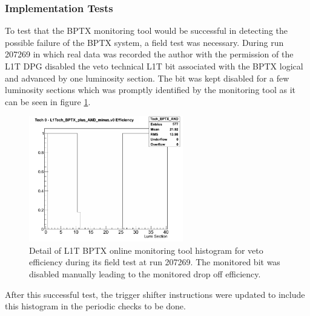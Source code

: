 \subsubsection{Implementation Tests}


To test that the \gls{BPTX} monitoring tool would be successful in detecting the possible failure of the \gls{BPTX} system, a field test was necessary. During run 207269 in which real data was recorded the author with the permission of the \gls{L1T} \gls{DPG} disabled the veto technical \gls{L1T} bit associated with the \gls{BPTX} logical and advanced by one luminosity section. The bit was kept disabled for a few luminosity sections which was promptly identified by the monitoring tool as it can be seen in figure \ref{FIGURE:TechnicalWork_L1TBPTX_ImplementationTests}.

\begin{figure}[!htb]
\centering
\includegraphics[width=0.60\textwidth]{Chapter03/L1TOnline/Images/L1TBPTX_Tech_BPTX_AND.png}
\caption[Detail of L1T BPTX online monitoring tool histogram for veto efficiency during its field test at run 207269.]
{Detail of \gls{L1T} \gls{BPTX} online monitoring tool histogram for veto efficiency during its field test at run 207269. The monitored bit was disabled manually leading to the monitored drop off efficiency.} 
\label{FIGURE:TechnicalWork_L1TBPTX_ImplementationTests}
\end{figure}

After this successful test, the trigger shifter instructions were updated to include this histogram in the periodic checks to be done.  

